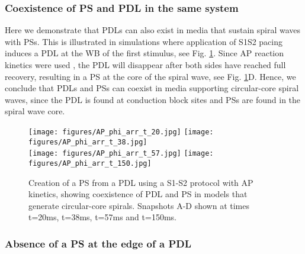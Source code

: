 \documentclass{article}
\begin{document}
\subsubsection{Coexistence of PS and PDL in the same system}

Here we demonstrate that PDLs can also exist in media that sustain spiral waves with PSs. This is illustrated in simulations where application of S1S2 pacing induces a PDL at the WB of the first stimulus, see Fig. \ref{fig:AP_spiral}. Since AP reaction kinetics were used \citep{Aliev:1996}, the PDL will disappear after both sides have reached full recovery, resulting in a PS at the core of the spiral wave, see Fig. \ref{fig:AP_spiral}D. Hence, we conclude that PDLs and PSs can coexist in media supporting circular-core spiral waves, since the PDL is found at conduction block sites and PSs are found in the spiral wave core.  


\begin{figure}
    \centering
{} 
\texttt{[image: figures/AP\_phi\_arr\_t\_20.jpg]}
\texttt{[image: figures/AP\_phi\_arr\_t\_38.jpg]}\\
\texttt{[image: figures/AP\_phi\_arr\_t\_57.jpg]}
\texttt{[image: figures/AP\_phi\_arr\_t\_150.jpg]}
    \caption{Creation of a PS from a PDL using a S1-S2 protocol with AP kinetics, showing coexistence of PDL and PS in models that generate circular-core spirals. Snapshots A-D shown at times t=20ms, t=38ms, t=57ms and t=150ms.  }
    \label{fig:AP_spiral}
\end{figure}


\subsubsection{Absence of a PS at the edge of a PDL}
\end{document}

